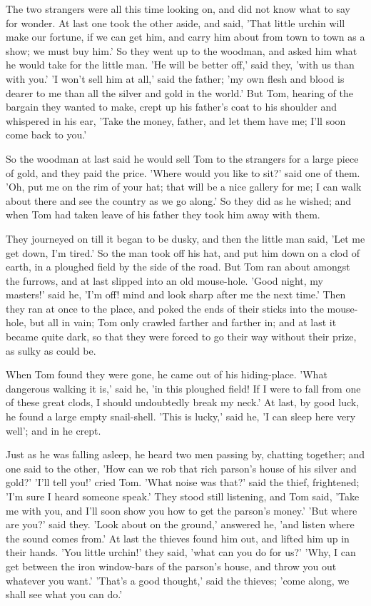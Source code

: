 \documentclass[12pt]{book}
\begin{document}
The two strangers were all this time looking on, and did not know what
to say for wonder. At last one took the other aside, and said, 'That
little urchin will make our fortune, if we can get him, and carry him
about from town to town as a show; we must buy him.' So they went up
to the woodman, and asked him what he would take for the little man.
'He will be better off,' said they, 'with us than with you.' 'I won't
sell him at all,' said the father; 'my own flesh and blood is dearer
to me than all the silver and gold in the world.' But Tom, hearing of
the bargain they wanted to make, crept up his father's coat to his
shoulder and whispered in his ear, 'Take the money, father, and let
them have me; I'll soon come back to you.'

So the woodman at last said he would sell Tom to the strangers for a
large piece of gold, and they paid the price. 'Where would you like to
sit?' said one of them. 'Oh, put me on the rim of your hat; that will
be a nice gallery for me; I can walk about there and see the country
as we go along.' So they did as he wished; and when Tom had taken
leave of his father they took him away with them.

They journeyed on till it began to be dusky, and then the little man
said, 'Let me get down, I'm tired.' So the man took off his hat, and
put him down on a clod of earth, in a ploughed field by the side of
the road. But Tom ran about amongst the furrows, and at last slipped
into an old mouse-hole. 'Good night, my masters!' said he, 'I'm off!
mind and look sharp after me the next time.' Then they ran at once to
the place, and poked the ends of their sticks into the mouse-hole, but
all in vain; Tom only crawled farther and farther in; and at last it
became quite dark, so that they were forced to go their way without
their prize, as sulky as could be.

When Tom found they were gone, he came out of his hiding-place. 'What
dangerous walking it is,' said he, 'in this ploughed field! If I were
to fall from one of these great clods, I should undoubtedly break my
neck.' At last, by good luck, he found a large empty snail-shell.
'This is lucky,' said he, 'I can sleep here very well'; and in he
crept.

Just as he was falling asleep, he heard two men passing by, chatting
together; and one said to the other, 'How can we rob that rich
parson's house of his silver and gold?' 'I'll tell you!' cried Tom.
'What noise was that?' said the thief, frightened; 'I'm sure I heard
someone speak.' They stood still listening, and Tom said, 'Take me
with you, and I'll soon show you how to get the parson's money.' 'But
where are you?' said they. 'Look about on the ground,' answered he,
'and listen where the sound comes from.' At last the thieves found him
out, and lifted him up in their hands. 'You little urchin!' they said,
'what can you do for us?' 'Why, I can get between the iron window-bars
of the parson's house, and throw you out whatever you want.' 'That's a
good thought,' said the thieves; 'come along, we shall see what you
can do.'
\end{document}
